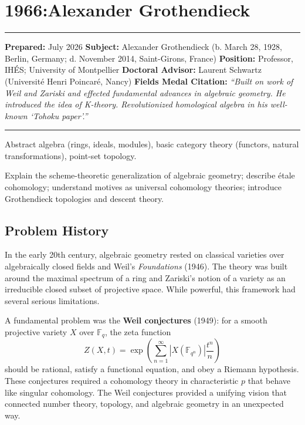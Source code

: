 \chapter{1966:Alexander Grothendieck}\label{ch1966alexandergrothendieck:alexander-grothendieck-fields-medal-1966-a-comprehensive-report}

\begin{center}\rule{0.5\linewidth}{0.5pt}\end{center}

\textbf{Prepared:} July 2026
\textbf{Subject:} Alexander Grothendieck (b. March 28, 1928, Berlin, Germany; d. November 2014, Saint-Girons, France)
\textbf{Position:} Professor, IHÉS; University of Montpellier
\textbf{Doctoral Advisor:} Laurent Schwartz (Université Henri Poincaré, Nancy)
\textbf{Fields Medal Citation:} \emph{``Built on work of Weil and Zariski and
effected fundamental advances in algebraic geometry. He introduced the idea of
K-theory. Revolutionized homological algebra in his well-known `Tohoku paper'.''}

\begin{center}\rule{0.5\linewidth}{0.5pt}\end{center}

\begin{prereqs} Abstract algebra (rings, ideals, modules), basic category theory
(functors, natural transformations), point-set topology.
\end{prereqs}

\begin{objectives} Explain the scheme-theoretic generalization of algebraic
geometry; describe étale cohomology; understand motives as universal cohomology
theories; introduce Grothendieck topologies and descent theory.
\end{objectives}

\section{Problem History}

In the early 20th century, algebraic geometry rested on classical varieties over
algebraically closed fields and Weil's \emph{Foundations} (1946). The theory was
built around the maximal spectrum of a ring and Zariski's notion of a variety as
an irreducible closed subset of projective space. While powerful, this framework
had several serious limitations.

A fundamental problem was the \textbf{Weil conjectures} (1949): for a smooth
projective variety $X$ over $\mathbb{F}_q$, the zeta function
\[
Z(X, t) = \exp\left(\sum_{n=1}^{\infty} |X(\mathbb{F}_{q^n})| \frac{t^n}{n}\right)
\]
should be rational, satisfy a functional equation, and obey a Riemann hypothesis.
These conjectures required a cohomology theory in characteristic $p$ that
behave like singular cohomology. The Weil conjectures provided a unifying vision
that connected number theory, topology, and algebraic geometry in an
unexpected way.

